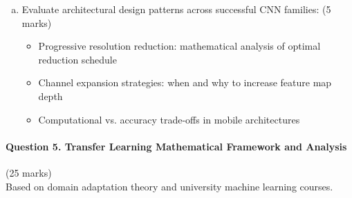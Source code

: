 \documentclass[12pt]{article}
\newcommand{\shortanswer}{\vspace{2cm}}
\newcommand{\mediumanswer}{\vspace{3cm}}
\begin{document}
\begin{enumerate}[(a)]
    \mediumanswer
    
    \item Evaluate architectural design patterns across successful CNN families: \hfill (5 marks)
    \begin{itemize}
        \item Progressive resolution reduction: mathematical analysis of optimal reduction schedule
        \item Channel expansion strategies: when and why to increase feature map depth
        \item Computational vs. accuracy trade-offs in mobile architectures
    \end{itemize}
    
    \shortanswer
\end{enumerate}

\newpage
\paragraph{Question 5. Transfer Learning Mathematical Framework and Analysis}{{\hfill (25 marks)}}\\
Based on domain adaptation theory and university machine learning courses.
\end{document}
